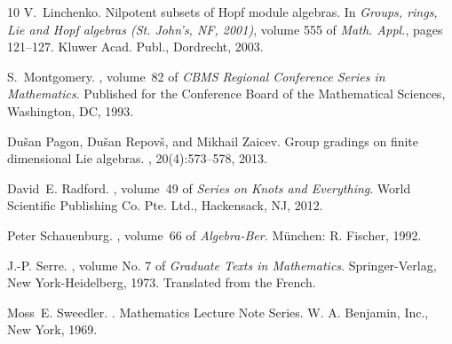 \documentclass[11pt,leqno]{article}
\theoremstyle{plain}
\theoremstyle{plain}
\theoremstyle{plain}
\numberwithin{equation}{section}
\theoremstyle{nonumberplain}
\newcommand\1{{\bf 1}}
\begin{document}
\begin{thebibliography}{10}
V.~Linchenko.
\newblock Nilpotent subsets of {H}opf module algebras.
\newblock In {\em Groups, rings, {L}ie and {H}opf algebras ({S}t. {J}ohn's,
  {NF}, 2001)}, volume 555 of {\em Math. Appl.}, pages 121--127. Kluwer Acad.
  Publ., Dordrecht, 2003.

S.~Montgomery.
, volume~82 of {\em
  CBMS Regional Conference Series in Mathematics}.
\newblock Published for the Conference Board of the Mathematical Sciences,
  Washington, DC, 1993.

Du{\v{s}}an Pagon, Du{\v{s}}an Repov{\v{s}}, and Mikhail Zaicev.
\newblock Group gradings on finite dimensional {L}ie algebras.
, 20(4):573--578, 2013.

David~E. Radford.
, volume~49 of {\em Series on Knots and
  Everything}.
\newblock World Scientific Publishing Co. Pte. Ltd., Hackensack, NJ, 2012.

Peter Schauenburg.
, volume~66 of
  {\em Algebra-Ber.}
\newblock M{\"u}nchen: R. Fischer, 1992.

J.-P. Serre.
, volume No. 7 of {\em Graduate Texts in
  Mathematics}.
\newblock Springer-Verlag, New York-Heidelberg, 1973.
\newblock Translated from the French.

Moss~E. Sweedler.
.
\newblock Mathematics Lecture Note Series. W. A. Benjamin, Inc., New York,
  1969.

\end{thebibliography}

\Addresses
\end{document}

